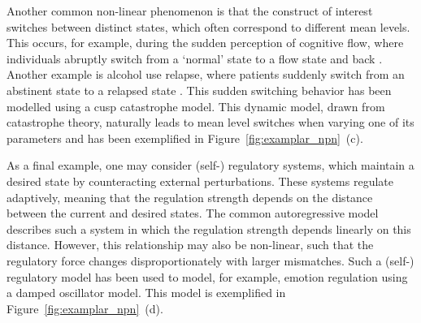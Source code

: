 \documentclass[jou, floatsintext]{apa7}
\begin{document}
Another common non-linear phenomenon is that the construct of interest switches
between distinct states, which often correspond to different mean levels. This
occurs, for example, during the sudden perception of cognitive flow, where
individuals abruptly switch from a `normal' state to a flow state and back
\parencite{ceja_suddenly_2012}. Another example is alcohol use relapse, where
patients suddenly switch from an abstinent state to a relapsed state
\parencite{witkiewitz_modeling_2007}. This sudden switching behavior has been
modelled using a cusp catastrophe model. This dynamic model, drawn from
catastrophe theory, naturally leads to mean level switches when varying one of
its parameters \parencite{van_der_maas_sudden_2003,chow_cusp_2015} and has been
exemplified in Figure~\ref{fig:examplar_npn}~(c).

As a final example, one may consider (self-) regulatory systems, which maintain
a desired state by counteracting external perturbations. These systems regulate
adaptively, meaning that the regulation strength depends on the distance
between the current and desired states. The common autoregressive model
describes such a system in which the regulation strength depends linearly on
this distance. However, this relationship may also be non-linear, such that the
regulatory force changes disproportionately with larger mismatches. Such a
(self-) regulatory model has been used to model, for example, emotion
regulation \parencite{chow_emotion_2005} using a damped oscillator model. This
model is exemplified in Figure~\ref{fig:examplar_npn}~(d).
\end{document}
